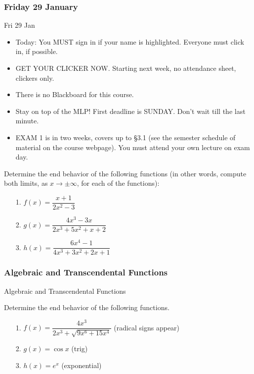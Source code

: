 \documentclass[cal1spr16Lectures.tex]{subfiles}
\begin{document}

\subsubsection{\bf Friday 29 January}
\begin{frame}[allowframebreaks]{Fri 29 Jan}
\begin{itemize}\footnotesize
\item Today: You MUST sign in if your name is highlighted.  Everyone must click in, if possible. 
\item GET YOUR CLICKER NOW.  Starting next week, no attendance sheet, clickers only.	
\item There is no Blackboard for this course.
\item Stay on top of the MLP!  First deadline is SUNDAY.  Don't wait till the last minute.
\item EXAM 1 is in two weeks, covers up to \S 3.1 (see the semester schedule of material on the course webpage).  \alert{You must attend your own lecture on exam day.}
\end{itemize}
\end{frame}

\begin{frame}%
\begin{exe} Determine the \alert{end behavior} of the following functions (in other words, compute both limits, as $x\to\pm\infty$, for each of the functions):
\begin{itemize}
\item[1.\;] $f(x)=\dfrac{x+1}{2x^2-3}$
\item[2.\;] $g(x)=\dfrac{4x^3-3x}{2x^3+5x^2+x+2}$
\item[3.\;] $h(x)=\dfrac{6x^4-1}{4x^3+3x^2+2x+1}$
\end{itemize}
\end{exe}
\end{frame}

\subsubsection{Algebraic and Transcendental Functions}
\begin{frame}{\small Algebraic and Transcendental Functions}
\begin{ex} Determine the end behavior of the following functions.
\begin{itemize}
\item[1.] $f(x) = \dfrac{4x^3}{2x^3+\sqrt{9x^6+15x^4}}$ (radical signs appear)

\vspace{1pc}
\item[2.] $g(x)=\cos x$ (trig)

\vspace{1pc}
\item[3.] $h(x)=e^x$ (exponential)
\end{itemize}
\end{ex}
\end{frame}
\end{document}
